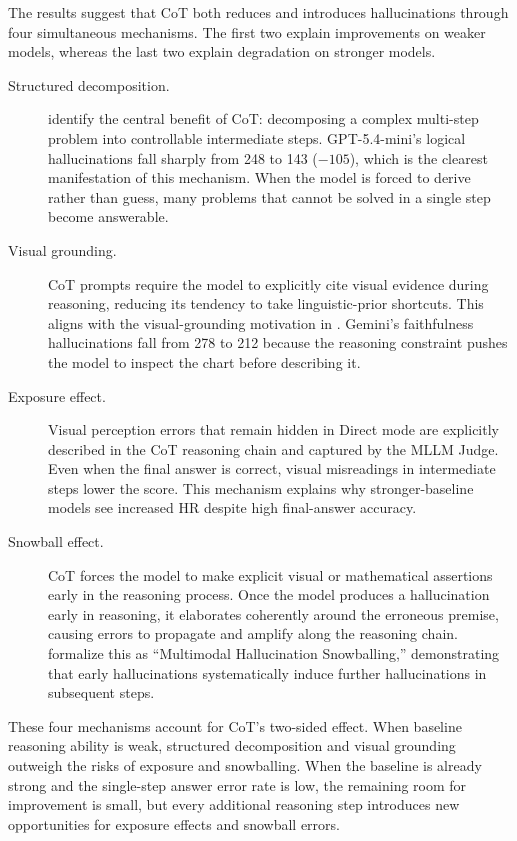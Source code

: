 The results suggest that CoT both reduces and introduces
hallucinations through four simultaneous mechanisms.
The first two explain improvements on weaker models,
whereas the last two explain degradation on stronger models.

\begin{description}
  \item[Structured decomposition.]
    \citet{weiChainThoughtPrompting2022} identify the central benefit of CoT:
    decomposing a complex multi-step problem into controllable intermediate steps.
    GPT-5.4-mini's logical hallucinations fall sharply from 248 to 143
    ($-105$),
    which is the clearest manifestation of this mechanism.
    When the model is forced to derive rather than guess,
    many problems that cannot be solved in a single step become answerable.

  \item[Visual grounding.]
    CoT prompts require the model to explicitly cite visual evidence
    during reasoning,
    reducing its tendency to take linguistic-prior shortcuts.
    This aligns with the visual-grounding motivation in
    \citet{zhengThinkingBeforeLooking2024}.
    Gemini's faithfulness hallucinations fall from 278 to 212
    because the reasoning constraint pushes the model
    to inspect the chart before describing it.

  \item[Exposure effect.] Visual perception errors that remain hidden in Direct mode
    are explicitly described in the CoT reasoning chain
    and captured by the MLLM Judge.
    Even when the final answer is correct,
    visual misreadings in intermediate steps lower the score.
    This mechanism explains why stronger-baseline models
    see increased HR despite high final-answer accuracy.

  \item[Snowball effect.] CoT forces the model to make explicit visual or mathematical assertions
    early in the reasoning process.
    Once the model produces a hallucination early in reasoning,
    it elaborates coherently around the erroneous premise,
    causing errors to propagate and amplify along the reasoning chain.
    \citet{zhongInvestigatingMitigatingMultimodal2024} formalize this as
    ``Multimodal Hallucination Snowballing,''
    demonstrating that early hallucinations systematically induce
    further hallucinations in subsequent steps.
\end{description}

These four mechanisms account for CoT's two-sided effect.
When baseline reasoning ability is weak,
structured decomposition and visual grounding outweigh
the risks of exposure and snowballing.
When the baseline is already strong and the single-step answer error rate
is low, the remaining room for improvement is small,
but every additional reasoning step introduces new opportunities
for exposure effects and snowball errors.

